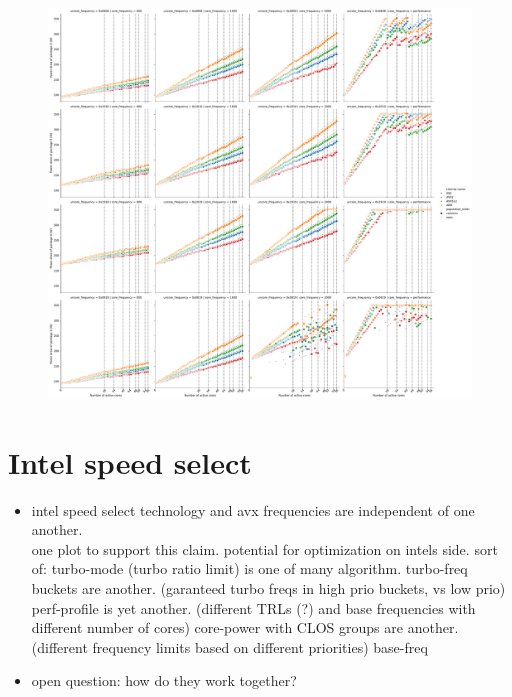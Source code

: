 \begin{figure}[]
    \centering
    \includegraphics[width=\columnwidth]{fig/core-power-regulators-package-power.pdf}
\end{figure}


\section{Intel speed select}
\label{sec:isst}

\begin{itemize}
    \item intel speed select technology and avx frequencies are independent of one another.\\
    one plot to support this claim. potential for optimization on intels side.
    sort of: turbo-mode (turbo ratio limit) is one of many algorithm.
    turbo-freq buckets are another. (garanteed turbo freqs in high prio buckets, vs low prio)
    perf-profile is yet another. (different TRLs (?) and base frequencies with different number of cores)
    core-power with CLOS groups are another. (different frequency limits based on different priorities)
    base-freq
    \item open question: how do they work together?
\end{itemize}


